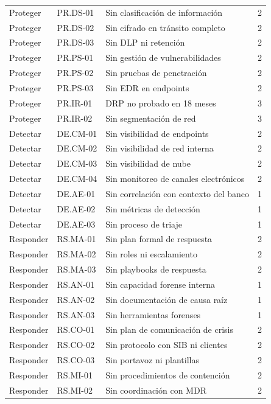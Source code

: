 \documentclass[11pt,a4paper]{article}
\begin{document}
\begin{longtable}{@{}p{2cm}p{2cm}p{6.5cm}c@{}}
		Proteger & PR.DS-01 & Sin clasificación de información & 2 \\
		Proteger & PR.DS-02 & Sin cifrado en tránsito completo & 2 \\
		Proteger & PR.DS-03 & Sin DLP ni retención & 2 \\
		Proteger & PR.PS-01 & Sin gestión de vulnerabilidades & 2 \\
		Proteger & PR.PS-02 & Sin pruebas de penetración & 2 \\
		Proteger & PR.PS-03 & Sin EDR en endpoints & 2 \\
		Proteger & PR.IR-01 & DRP no probado en 18 meses & 3 \\
		Proteger & PR.IR-02 & Sin segmentación de red & 3 \\ \midrule
		Detectar & DE.CM-01 & Sin visibilidad de endpoints & 2 \\
		Detectar & DE.CM-02 & Sin visibilidad de red interna & 2 \\
		Detectar & DE.CM-03 & Sin visibilidad de nube & 2 \\
		Detectar & DE.CM-04 & Sin monitoreo de canales electrónicos & 2 \\
		Detectar & DE.AE-01 & Sin correlación con contexto del banco & 1 \\
		Detectar & DE.AE-02 & Sin métricas de detección & 1 \\
		Detectar & DE.AE-03 & Sin proceso de triaje & 1 \\ \midrule
		Responder & RS.MA-01 & Sin plan formal de respuesta & 2 \\
		Responder & RS.MA-02 & Sin roles ni escalamiento & 2 \\
		Responder & RS.MA-03 & Sin playbooks de respuesta & 2 \\
		Responder & RS.AN-01 & Sin capacidad forense interna & 1 \\
		Responder & RS.AN-02 & Sin documentación de causa raíz & 1 \\
		Responder & RS.AN-03 & Sin herramientas forenses & 1 \\
		Responder & RS.CO-01 & Sin plan de comunicación de crisis & 2 \\
		Responder & RS.CO-02 & Sin protocolo con SIB ni clientes & 2 \\
		Responder & RS.CO-03 & Sin portavoz ni plantillas & 2 \\
		Responder & RS.MI-01 & Sin procedimientos de contención & 2 \\
		Responder & RS.MI-02 & Sin coordinación con MDR & 2 \\

\end{longtable}
\end{document}
